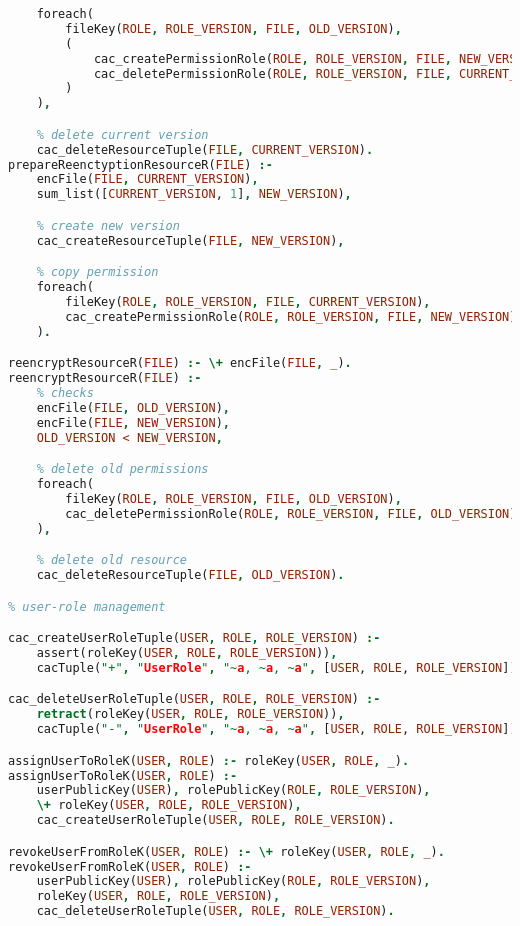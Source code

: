 \begin{lstlisting}[language=Prolog]
    % copy permission (and delete current ones)
    foreach(
        fileKey(ROLE, ROLE_VERSION, FILE, OLD_VERSION),
        (
            cac_createPermissionRole(ROLE, ROLE_VERSION, FILE, NEW_VERSION),
            cac_deletePermissionRole(ROLE, ROLE_VERSION, FILE, CURRENT_VERSION)
        )
    ),

    % delete current version
    cac_deleteResourceTuple(FILE, CURRENT_VERSION).
prepareReenctyptionResourceR(FILE) :-                                       % the file has only one version
    encFile(FILE, CURRENT_VERSION),
    sum_list([CURRENT_VERSION, 1], NEW_VERSION),                               % new version key

    % create new version
    cac_createResourceTuple(FILE, NEW_VERSION),

    % copy permission
    foreach(
        fileKey(ROLE, ROLE_VERSION, FILE, CURRENT_VERSION),
        cac_createPermissionRole(ROLE, ROLE_VERSION, FILE, NEW_VERSION)
    ).

reencryptResourceR(FILE) :- \+ encFile(FILE, _).
reencryptResourceR(FILE) :- 
    % checks
    encFile(FILE, OLD_VERSION),
    encFile(FILE, NEW_VERSION),
    OLD_VERSION < NEW_VERSION,

    % delete old permissions
    foreach(
        fileKey(ROLE, ROLE_VERSION, FILE, OLD_VERSION),
        cac_deletePermissionRole(ROLE, ROLE_VERSION, FILE, OLD_VERSION)
    ),

    % delete old resource
    cac_deleteResourceTuple(FILE, OLD_VERSION).

% user-role management

cac_createUserRoleTuple(USER, ROLE, ROLE_VERSION) :-
    assert(roleKey(USER, ROLE, ROLE_VERSION)),
    cacTuple("+", "UserRole", "~a, ~a, ~a", [USER, ROLE, ROLE_VERSION]).

cac_deleteUserRoleTuple(USER, ROLE, ROLE_VERSION) :-
    retract(roleKey(USER, ROLE, ROLE_VERSION)),
    cacTuple("-", "UserRole", "~a, ~a, ~a", [USER, ROLE, ROLE_VERSION]).

assignUserToRoleK(USER, ROLE) :- roleKey(USER, ROLE, _).
assignUserToRoleK(USER, ROLE) :-
    userPublicKey(USER), rolePublicKey(ROLE, ROLE_VERSION),                                 % checks
    \+ roleKey(USER, ROLE, ROLE_VERSION),                                                   % already member
    cac_createUserRoleTuple(USER, ROLE, ROLE_VERSION).

revokeUserFromRoleK(USER, ROLE) :- \+ roleKey(USER, ROLE, _).
revokeUserFromRoleK(USER, ROLE) :-
    userPublicKey(USER), rolePublicKey(ROLE, ROLE_VERSION),                                 % checks
    roleKey(USER, ROLE, ROLE_VERSION),                                                      % is member
    cac_deleteUserRoleTuple(USER, ROLE, ROLE_VERSION).


\end{lstlisting}
